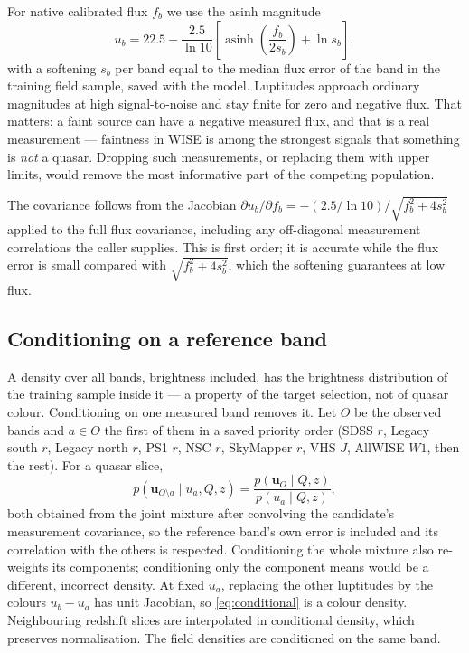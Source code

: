 \documentclass[11pt,a4paper]{article}
\newcommand{\uvec}{\mathbf{u}}
\begin{document}
For native calibrated flux $f_b$ we use the asinh magnitude
%
\begin{equation}
u_b=22.5-\frac{2.5}{\ln 10}
 \left[\operatorname{asinh}\left(\frac{f_b}{2s_b}\right)+\ln s_b\right],
\label{eq:luptitude}
\end{equation}
%
with a softening $s_b$ per band equal to the median flux error of the band in
the training field sample, saved with the model. Luptitudes approach ordinary
magnitudes at high signal-to-noise and stay finite for zero and negative flux.
That matters: a faint source can have a negative measured flux, and that is a
real measurement --- faintness in WISE is among the strongest signals that
something is \emph{not} a quasar. Dropping such measurements, or replacing them
with upper limits, would remove the most informative part of the competing
population.

The covariance follows from the Jacobian
$\partial u_b/\partial f_b = -(2.5/\ln10)/\sqrt{f_b^2+4s_b^2}$ applied to the full
flux covariance, including any off-diagonal measurement correlations the caller
supplies. This is first order; it is accurate while the flux error is small
compared with $\sqrt{f_b^2+4s_b^2}$, which the softening guarantees at low flux.

\subsection{Conditioning on a reference band}
\label{sec:reference}

A density over all bands, brightness included, has the brightness distribution
of the training sample inside it --- a property of the target selection, not of
quasar colour. Conditioning on one measured band removes it. Let $O$ be the
observed bands and $a\in O$ the first of them in a saved priority order
(SDSS $r$, Legacy south $r$, Legacy north $r$, PS1 $r$, NSC $r$, SkyMapper
$r$, VHS $J$, AllWISE $W1$, then the rest). For a quasar slice,
%
\begin{equation}
p(\uvec_{O\setminus a}\mid u_a,Q,z)
=\frac{p(\uvec_{O}\mid Q,z)}{p(u_a\mid Q,z)},
\label{eq:conditional}
\end{equation}
%
both obtained from the joint mixture after convolving the candidate's
measurement covariance, so the reference band's own error is included and its
correlation with the others is respected. Conditioning the whole mixture also
re-weights its components; conditioning only the component means would be a
different, incorrect density. At fixed $u_a$, replacing the other luptitudes by
the colours $u_b-u_a$ has unit Jacobian, so \eqref{eq:conditional} is a colour
density. Neighbouring redshift slices are interpolated in conditional density,
which preserves normalisation. The field densities are conditioned on the same
band.
\end{document}
